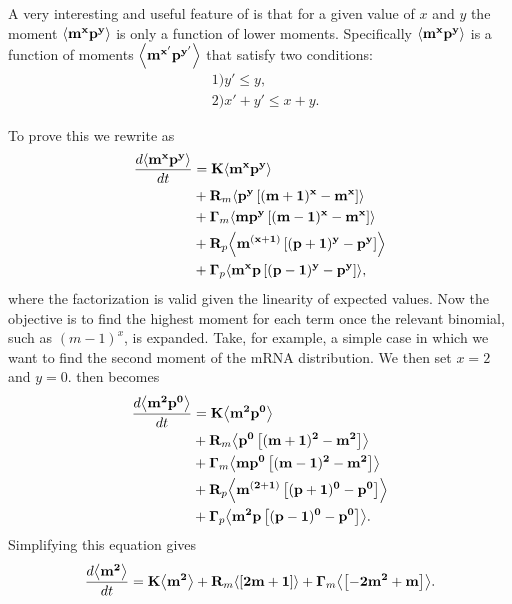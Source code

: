 A very interesting and useful feature of  is that for a given
value of $x$ and $y$ the moment $\mathbf{\left\langle m^x p^y \right\rangle}$ is only a function of lower
moments. Specifically $\mathbf{\left\langle m^x p^y \right\rangle}$ is a function of moments
$\mathbf{\left\langle m^{x'} p^{y'} \right\rangle}$ that satisfy two conditions:
\begin{equation}
  \begin{aligned}
    &1) y' \leq y,\\
  &2) x' + y' \leq x + y.
  \end{aligned}
  \label{seq_mom_conditions}
\end{equation}

To prove this we rewrite  as
\begin{equation}
  \begin{aligned}
    {d{\mathbf{\left\langle m^x p^y \right\rangle}} \over dt} &=
    \mathbf{K} \mathbf{\left\langle m^x p^y \right\rangle}\\
    &+ \mathbf{R}_m \mathbf{\left\langle p^y \left[ (m + 1)^x -m^x \right] \right\rangle}\\
    &+ \mathbf{\Gamma}_m \mathbf{\left\langle m p^y \left[ (m - 1)^x - m^x \right] \right\rangle}\\
    &+ \mathbf{R}_p \mathbf{\left\langle m^{(x + 1)} \left[ (p + 1)^y - p^y \right] \right\rangle}\\
    &+ \mathbf{\Gamma}_p \mathbf{\left\langle m^x p \left[ (p - 1)^y - p^y \right] \right\rangle},
    \label{seq_mom_ode_factorized}
  \end{aligned}
\end{equation}
where the factorization is valid given the linearity of expected values. Now the
objective is to find the highest moment for each term once the relevant
binomial, such as $(m-1)^x$, is expanded. Take, for example, a simple case in
which we want to find the second moment of the mRNA distribution. We then set $x
= 2$ and $y = 0$.  then becomes
\begin{equation}
  \begin{aligned}
    {d{\mathbf{\left\langle m^2 p^0 \right\rangle}} \over dt} &=
    \mathbf{K} \mathbf{\left\langle m^2 p^0 \right\rangle}\\
    &+ \mathbf{R}_m \mathbf{\left\langle p^0 \left[ (m + 1)^2 - m^2 \right] \right\rangle}\\
    &+ \mathbf{\Gamma}_m \mathbf{\left\langle m p^0 \left[ (m - 1)^2 - m^2 \right] \right\rangle}\\
    &+ \mathbf{R}_p \mathbf{\left\langle m^{(2 + 1)} \left[ (p + 1)^0 - p^0 \right] \right\rangle}\\
    &+ \mathbf{\Gamma}_p \mathbf{\left\langle m^2 p \left[ (p - 1)^0 - p^0 \right] \right\rangle}.
  \end{aligned}
\end{equation}
Simplifying this equation gives
\begin{equation}
    {d{\mathbf{\left\langle m^2 \right\rangle}} \over dt} =
    \mathbf{K} \mathbf{\left\langle m^2 \right\rangle}
    + \mathbf{R}_m \mathbf{\left\langle \left[ 2m + 1 \right] \right\rangle}
    + \mathbf{\Gamma}_m \mathbf{\left\langle \left[- 2m^2 + m \right] \right\rangle}.
    \label{seq_second_mom_mRNA}
\end{equation}

